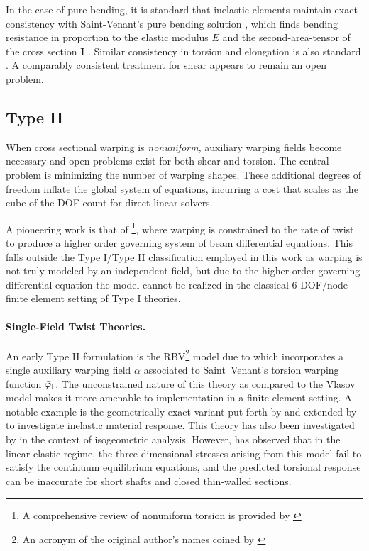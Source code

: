 In the case of pure bending, it is standard that inelastic elements maintain exact consistency with Saint-Venant's pure bending solution \citep[Art.87]{love1944treatise}, which finds bending resistance in proportion to the elastic modulus \(E\) and the second-area-tensor of the cross section \(\bm{I}\) \citep{spacone1992beam,simo1984numerical}. 
Similar consistency in torsion and elongation is also standard \citep{gruttmann1998geometrical}. 
A comparably consistent treatment for shear appears to remain an open problem.


\subsection{Type II}
When cross sectional warping is \emph{nonuniform}, auxiliary warping fields become necessary and open problems exist for both shear and torsion. 
The central problem is minimizing the number of warping shapes. 
These additional degrees 
of freedom inflate the global system of equations, incurring a cost 
that scales as the cube of the DOF count for direct linear solvers.

A pioneering work is that of \cite{timoshenko1905torsional,vlasov1961thinwalled}\footnote{A comprehensive review of nonuniform torsion is provided by \cite{armero2021modeling}}, where warping is constrained to the rate of twist to produce a higher order governing system of beam differential equations. 
This falls outside the Type I/Type II classification employed in this work as warping is not truly modeled by an independent field, but due to the higher-order governing differential equation the model cannot be realized in the classical 6-DOF/node finite element setting of Type I theories. 

\paragraph{Single-Field Twist Theories.}
An early Type II formulation is the RBV\footnote{An acronym of the original author's names coined by \cite{armero2021modeling}} model due to \cite{reissner1952nonuniform,benscoter1954theory} which incorporates a single auxiliary warping field \(\alpha\) associated to Saint~Venant's torsion warping function \(\bar{\varphi}_{\rm I}\). 
The unconstrained nature of this theory as compared to the Vlasov model makes it more amenable to implementation in a finite element setting. 
A notable example is the geometrically exact variant put forth by \cite{simo1991geometricallyexact} and extended by \cite{gruttmann2000theory} to investigate inelastic material response. 
This theory has also been investigated by \cite{rong2020geometrically} in the context of isogeometric analysis. 
However, \cite{armero2021modeling} has observed that in the linear-elastic regime, the three dimensional stresses arising from this model fail to satisfy the continuum equilibrium equations, and the predicted torsional response can be inaccurate for short shafts and closed thin-walled sections. 


